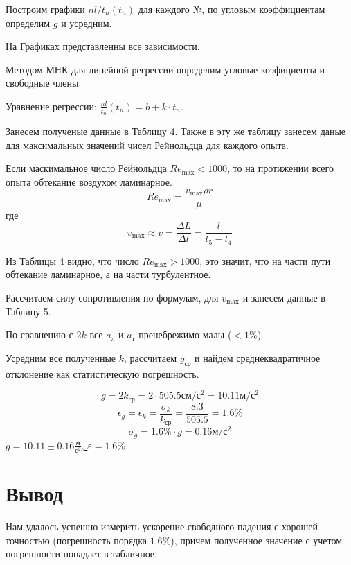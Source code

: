 \documentclass[12pt]{article}
\begin{document}
Построим графики $nl/t_n(t_n)$ для каждого №, по угловым коэффициентам определим $g$ и усредним.

На Графиках представленны все зависимости.

Методом МНК для линейной регрессии определим угловые коэфициенты и свободные члены.

Уравнение регрессии: $\frac{nl}{t_n}(t_n) =  b + k\cdot t_n$.

Занесем полученые данные в Таблицу 4. Также в эту же таблицу занесем даные для максимальных значений чисел Рейнольдца для каждого опыта.

Если маскимальное число Рейнольдца $Re_{\max} < 1000$, то на протижении всего опыта обтекание воздухом ламинарное.
\[Re_{\max}=\frac{v_{\max}\rho r}{\mu}\]
где
\[v_{\max} \approx v=\frac{\Delta L}{\Delta t}=\frac{l}{t_5-t_4}\]

Из Таблицы 4 видно, что число $Re_ {\max}>1000$, это значит, что на части пути обтекание ламинарное, а на части турбулентное.

Рассчитаем силу сопротивления по формулам, для $v_{\max}$ и занесем данные в Таблицу 5.

По сравнению с $2k$ все $a_\text{л}$ и $a_\text{т}$ пренебрежимо малы ($<1\%$).

Усредним все полученные $k$, рассчитаем $g_\text{ср}$ и найдем среднеквадратичное отклонение как статистическую погрешность.

\[g=2k_\text{ср}=2\cdot505.5\text{см}/\text{с}^2=10.11\text{м}/\text{с}^2\]
\[\epsilon_g=\epsilon_k=\frac{\sigma_k}{k_\text{ср}}=\frac{8.3}{505.5}=1.6\%\]
\[\sigma_g=1.6\%\cdot g=0.16\text{м}/\text{с}^2\]
\underline{$g = 10.11 \pm 0.16 \frac{\text{м}}{\text{с}^2}$, $\varepsilon = 1.6\%$}
\section{Вывод}

Нам удалось успешно измерить ускорение свободного падения с хорошей точностью (погрешность порядка $1.6\%$), причем полученное значение с учетом погрешности попадает в табличное.
\newpage
\end{document}

